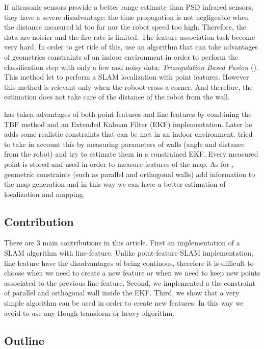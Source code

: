 \documentclass[a4paper,12pt]{article}
\begin{document}
If ultrasonic sensors provide a better range estimate than PSD infrared sensors, they have a severe disadvantage: the time propagation is not negligeable when the distance measured id too far nor the robot speed too high. Therefore, the data are noisier and the fire rate is limited. The feature association  task become very hard. In order to get ride of this, \cite{zunino2001simultaneous} use an algorithm that can take advantages of geometrics constraints of an indoor environment in order to perform the classification step with only a few and noisy data: \textit{Triangulation Based Fusion} (\cite{wijk1998triangulation}). This method let to perform a SLAM localization with point features.
However this method is relevant only when the roboot cross a corner. And therefore, the estimation does not take care of the distance of the robot from the wall.

\cite{choi2005robust} has taken advantages of both point features and line features by combining the TBF method and an Extended Kalman Filter (EKF) implementation.
Later he adds some realistic constraints that can be met in an indoor environment.
\cite{choi2008line} tried to take in account this by measuring parameters of walls (angle and distance from the robot) and try to estimate them in a constrained EKF. Every measured point is stored and used in order to measure features of the map. As for \cite{nguyen2006orthogonal}, geometric constraints (such as parallel and orthogonal walls) add information to the map generation and in this way we can have a better estimation of localization and mapping.

\subsection{Contribution}
There are 3 main contributions in this article.
First an implementation of a SLAM algorithm with line-feature. Unlike point-feature SLAM implementation, line-feature have the disadvantages of being contiuous, therefore it is difficult to choose when we need to create a new feature or when we need to keep new points associated to the previous line-feature.
Second, we implemented a the constraint of parallel and orthogonal wall inside the EKF.
Third, we show that a very simple algorithm can be used in order to create new features. In this way we avoid to use any Hough transform or heavy algorithm.

\subsection{Outline}
\end{document}
